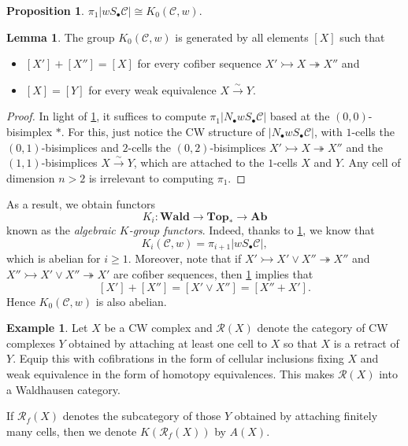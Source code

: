\documentclass[10pt,letterpaper,cm]{nupset}
\theoremstyle{definition}
\newtheorem{exmp}[definition]{Example}
\theoremstyle{theorem}
\newtheorem{lemma}[definition]{Lemma}
\newtheorem{prop}[definition]{Proposition}
\theoremstyle{remark}
\newcommand{\1}{\mathbf{1}}
\renewcommand{\c}{\mathscr{C}}
\newcommand{\0}{\vec 0}
\begin{document}
\begin{prop}\label{P4}
$\pi_1\left\lvert{w S_{\bullet} \c}\right\rvert \cong K_0(\c, w)$.
\end{prop}

\begin{lemma}\label{L8}
The group $K_0(\c, w)$ is generated by all elements $\left[X\right]$ such that 
\begin{itemize}
\item $\left[X'\right] + \left[X''\right] = \left[X\right]$ for every cofiber sequence $X' \rightarrowtail X \twoheadrightarrow X''$ and
\item  $\left[X\right] = \left[Y\right]$ for every weak equivalence $X \overset{\sim}{\longrightarrow} Y$.
\end{itemize}
\end{lemma}
\begin{proof}
In light of \cref{P4}, it suffices to compute $\pi_1\left\lvert{N_{\bullet}w S_{\bullet} \c}\right\rvert$ based at the $(0,0)$-bisimplex $\ast$. For this, just notice the CW structure of $\left\lvert{N_{\bullet}w S_{\bullet} \c}\right\rvert$,  with $1$-cells the $(0,1)$-bisimplices and $2$-cells the $(0,2)$-bisimplices $X' \rightarrowtail X \twoheadrightarrow X''$ and the $(1,1)$-bisimplices $X \overset{\sim}{\longrightarrow} Y$, which are attached to the $1$-cells $X$ and $Y$. Any cell of dimension $n>2$ is irrelevant to computing $\pi_1$.
\end{proof}


As a result, we obtain functors $$K_i : \mathbf{Wald} \to \mathbf{Top_{\ast}} \to \mathbf{Ab}$$ known as the \textit{algebraic $K$-group functors}. Indeed, thanks to \cref{P4}, we know that $$K_i(\c, w) = \pi_{i+1}\left\lvert{w S_{\bullet} \c}\right\rvert,$$ which is abelian for $i\geq 1$. Moreover, note that if $X' \rightarrowtail X' \vee X'' \twoheadrightarrow X''$ and $X'' \rightarrowtail X' \vee X'' \twoheadrightarrow X'$ are cofiber sequences, then \cref{L8} implies that $$\left[X'\right] + \left[X''\right] = \left[X' \vee X''\right] = \left[X'' + X'\right].$$ Hence $K_0(\c, w)$ is also abelian.


\begin{exmp}
Let $X$ be a CW complex and $\mathcal{R}(X)$ denote the category of CW complexes $Y$  obtained  by attaching at least one cell to $X$ so that $X$ is a retract of $Y$. Equip this with cofibrations in the form of cellular inclusions fixing $X$ and weak equivalence in the form of homotopy equivalences. This makes $\mathcal{R}(X)$ into a Waldhausen category. 

\smallskip
If $\mathcal{R}_f(X)$ denotes the subcategory of those $Y$ obtained by attaching finitely many cells, then we denote  $K(\mathcal{R}_f(X))$ by $A(X)$.
\end{exmp}
\end{document}
